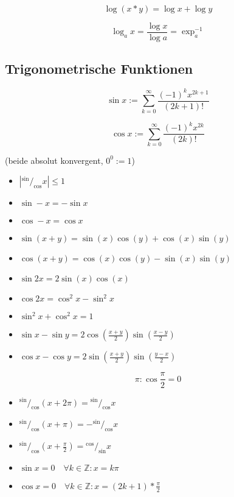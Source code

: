 $$\log (x * y) = \log x + \log y$$

$$\log_a x = \frac{\log x}{\log a} = \exp_a^{-1}$$


\subsection{Trigonometrische Funktionen}

$$\sin x := \sum_{k = 0}^\infty \frac{(-1)^k x^{2k + 1}}{(2k + 1)!}$$

$$\cos x := \sum_{k = 0}^\infty \frac{(-1)^k x^{2k}}{(2k)!}$$

(beide absolut konvergent, $0^0 := 1$)

\begin{itemize}
  \item $|{}^{\sin}/_{\cos} x| \leq 1$
  \item $\sin - x = - \sin x$
  \item $\cos - x = \cos x$
  \item $\sin (x + y) = \sin(x) \cos(y) + \cos(x) \sin (y)$
  \item $\cos (x + y) = \cos(x) \cos(y) - \sin(x) \sin (y)$
  \item $\sin 2x = 2 \sin (x) \cos (x)$
  \item $\cos 2x = \cos^2 x - \sin^2 x$
  \item $\sin^2 x + \cos^2 x = 1$
  \item $\sin x - \sin y = 2 \cos (\frac{x + y}{2}) \sin(\frac{x - y}{2})$
  \item $\cos x - \cos y = 2 \sin (\frac{x + y}{2}) \sin(\frac{y - x}{2})$
\end{itemize}

$$\pi: \cos \frac{\pi}{2} = 0$$


\begin{itemize}
  \item ${}^{\sin}/_{\cos} (x + 2\pi) = {}^{\sin}/_{\cos} x$
  \item ${}^{\sin}/_{\cos} (x + \pi) = - {}^{\sin}/_{\cos} x$
  \item ${}^{\sin}/_{\cos} (x + \frac{\pi}{2}) = {}^{\cos}/_{\sin} x$
  \item $\sin x = 0 \quad \forall k \in \mathbb{Z}: x = k \pi$
  \item $\cos x = 0 \quad \forall k \in \mathbb{Z}: x = (2k + 1) *\frac{\pi}{2}$
\end{itemize}

